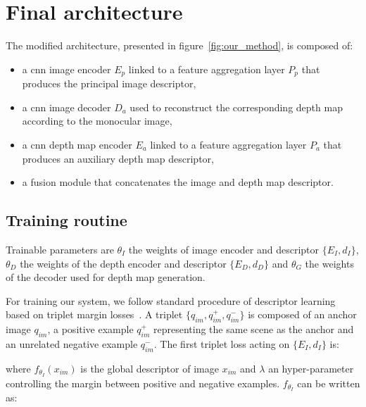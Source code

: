 \section{Final architecture}
\label{sec:method}


%

The modified architecture, presented in figure~\ref{fig:our_method}, is composed of:

\begin{itemize}
	\item a \ac{cnn} image encoder $E_p$ linked to a feature aggregation layer $P_p$ that produces the principal image descriptor,
	\item a \ac{cnn} image decoder $D_a$ used to reconstruct the corresponding depth map according to the monocular image,
	\item a \ac{cnn} depth map encoder $E_a$ linked to a feature aggregation layer $P_a$ that produces an auxiliary depth map descriptor,
	\item a fusion module that concatenates the image and depth map descriptor.
\end{itemize}

\subsection{Training routine}
\label{subsec:training}
Trainable parameters are $\theta_{I}$ the weights of image encoder and descriptor $\{E_I, d_I\}$, $\theta_{D}$ the weights of the depth encoder and descriptor $\{E_D, d_D\}$ and $\theta_{G}$ the weights of the decoder used for depth map generation. 

For training our system, we follow standard procedure of descriptor learning based on triplet margin losses~\cite{Arandjelovic2017}. A triplet $\{q_{im}, q_{im}^+, q_{im}^-\}$ is composed of an anchor image $q_{im}$, a positive example $q_{im}^+$ representing the same scene as the anchor and an unrelated negative example $q_{im}^-$.
The first triplet loss acting on $\{E_I, d_I\}$ is:


where $f_{\theta_{I}}(x_{im})$ is the global descriptor of image $x_{im}$ and $\lambda$ an hyper-parameter controlling the margin between positive and negative examples. $f_{\theta_{I}}$ can be written as:

